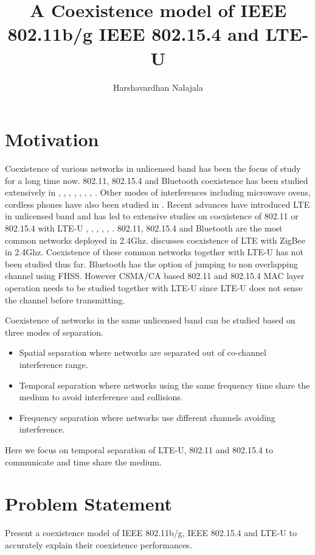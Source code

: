 \documentclass{article}
\begin{document}
	\title{A Coexistence model of {IEEE} 802.11b/g {IEEE} 802.15.4 and {LTE-U}}
	\author{Harshavardhan Nalajala}
	\maketitle
	\tableofcontents
	\section{Motivation}
	Coexistence of various networks in unlicensed band has been the focus of study for a long time now. 802.11, 802.15.4 and Bluetooth coexistence has been studied extensively in \cite{953230}, \cite{4024941}, \cite{1666534}, \cite{7793984}, \cite{6425289}, \cite{4436237}, \cite{Tytgat2012}, \cite{6645003}. Other modes of interferences including microwave ovens, cordless phones have also been studied in \cite{5210929}. Recent advances have introduced {LTE} in unlicensed band and has led to extensive studies on coexistence of 802.11 or 802.15.4 with {LTE-U} \cite{7564872}, \cite{7497766}, \cite{7419263}, \cite{7583669}, \cite{7063521}, \cite{7506714}.  802.11, 802.15.4 and {Bluetooth} are the most common networks deployed in {2.4Ghz}. \cite{7506714} discusses coexistence of {LTE} with {ZigBee} in {2.4Ghz}. Coexistence of these common networks together with {LTE-U} has not been studied thus far. {Bluetooth} has the option of jumping to non overlapping channel using {FHSS}. However {CSMA/CA} based 802.11 and 802.15.4 {MAC} layer operation needs to be studied together with {LTE-U} since {LTE-U} does not sense the channel before transmitting.
	
Coexistence of networks in the same unlicensed band can be studied based on three modes of separation.
	\begin{itemize}
		\item Spatial separation where networks are separated out of co-channel interference range.
		\item Temporal separation where networks using the same frequency time share the medium to avoid interference and collisions.
		\item Frequency separation where networks use different channels avoiding interference.
	\end{itemize}
Here we focus on temporal separation of {LTE-U}, 802.11 and 802.15.4 to communicate and time share the medium.

	\section{Problem Statement}
	Present a coexistence model of {IEEE} 802.11b/g, {IEEE} 802.15.4 and {LTE-U} to accurately explain their coexistence performances.
	
\end{document}
